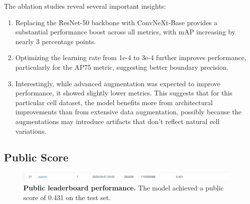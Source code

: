 \documentclass[twocolumn,a4paper]{article}
\begin{document}
\begin{table}[h]
\centering
\caption{\textbf{Impact of Different Components on Model Performance.} This table demonstrates the incremental improvements achieved through architectural and training strategy optimizations. The ConvNeXt-Base backbone with optimized learning rate achieves the best overall performance.}
\label{tab:ablation}
\end{table}

The ablation studies reveal several important insights:
\begin{enumerate}
\item Replacing the ResNet-50 backbone with ConvNeXt-Base provides a substantial performance boost across all metrics, with mAP increasing by nearly 3 percentage points.
\item Optimizing the learning rate from 1e-4 to 3e-4 further improves performance, particularly for the AP75 metric, suggesting better boundary precision.
\item Interestingly, while advanced augmentation was expected to improve performance, it showed slightly lower metrics. This suggests that for this particular cell dataset, the model benefits more from architectural improvements than from extensive data augmentation, possibly because the augmentations may introduce artifacts that don't reflect natural cell variations.
\end{enumerate}


\subsection{Public Score}

\begin{figure}[H]
\centering
\includegraphics[width=0.95\linewidth]{figs/screenshot001}
\caption{\textbf{Public leaderboard performance.} The model achieved a public score of 0.431 on the test set.}
\label{fig:public score}
\end{figure}
\end{document}
